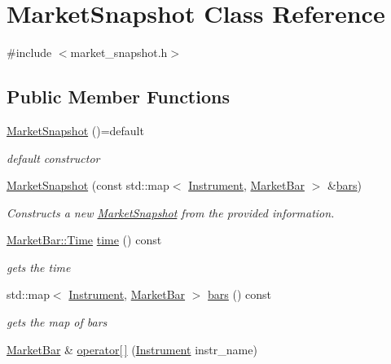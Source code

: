 \hypertarget{classMarketSnapshot}{}\section{Market\+Snapshot Class Reference}
\label{classMarketSnapshot}


{\ttfamily \#include $<$market\+\_\+snapshot.\+h$>$}

\subsection*{Public Member Functions}
\begin{DoxyCompactItemize}
\item 
\hyperlink{classMarketSnapshot_afb9edf14f6472bfcae695c5f4a46abff}{Market\+Snapshot} ()=default
\begin{DoxyCompactList}\small\item\em default constructor \end{DoxyCompactList}\item 
\hyperlink{classMarketSnapshot_a5e1530204818ffaea1e479d9371e77ae}{Market\+Snapshot} (const std\+::map$<$ \hyperlink{classInstrument}{Instrument}, \hyperlink{classMarketBar}{Market\+Bar} $>$ \&\hyperlink{classMarketSnapshot_ae8ab3cf282daf2c0001c583ead3b3250}{bars})
\begin{DoxyCompactList}\small\item\em Constructs a new \hyperlink{classMarketSnapshot}{Market\+Snapshot} from the provided information. \end{DoxyCompactList}\item 
\hyperlink{classMarketBar_a0d7dabe1fd00e674ef72f54bb1ff9ad0}{Market\+Bar\+::\+Time} \hyperlink{classMarketSnapshot_a4bc2e6b766eff94c43aa5a45282f797f}{time} () const
\begin{DoxyCompactList}\small\item\em gets the time \end{DoxyCompactList}\item 
std\+::map$<$ \hyperlink{classInstrument}{Instrument}, \hyperlink{classMarketBar}{Market\+Bar} $>$ \hyperlink{classMarketSnapshot_ae8ab3cf282daf2c0001c583ead3b3250}{bars} () const
\begin{DoxyCompactList}\small\item\em gets the map of bars \end{DoxyCompactList}\item 
\hyperlink{classMarketBar}{Market\+Bar} \& \hyperlink{classMarketSnapshot_ad8ad2cc84487f9b21d3db3604d2b1590}{operator\mbox{[}$\,$\mbox{]}} (\hyperlink{classInstrument}{Instrument} instr\+\_\+name)

\end{DoxyCompactItemize}
